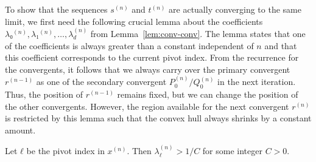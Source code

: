 To show that the sequences $s^{(n)}$ and $t^{(n)}$ are actually
converging to the same limit, we first need the following crucial lemma about the
coefficients $λ₀^{(n)}, λ₁^{(n)}, …, λ_d^{(n)}$ from Lemma~\ref{lem:conv-conv}.
The lemma states that one of the coefficients is always greater than a constant
independent of $n$ and that this coefficient corresponds to the current pivot index.
From the recurrence for the convergents,
it follows that we always carry over the primary convergent $r^{(n-1)}$ as one
of the secondary convergent $P_0^{(n)}/Q_0^{(n)}$ in the next iteration.
Thus, the position of $r^{(n-1)}$ remains fixed,
but we can change the position of the other convergents.
However,
the region available for the next convergent $r^{(n)}$ is restricted by this lemma
such that the convex hull always shrinks by a constant amount.

\begin{lemma}
  \label{lem:lambda-pos}
  Let $ℓ$ be the pivot index in $x^{(n)}$.
  Then $λ_ℓ^{(n)} > 1/C$ for some integer $C > 0$.
\end{lemma}

